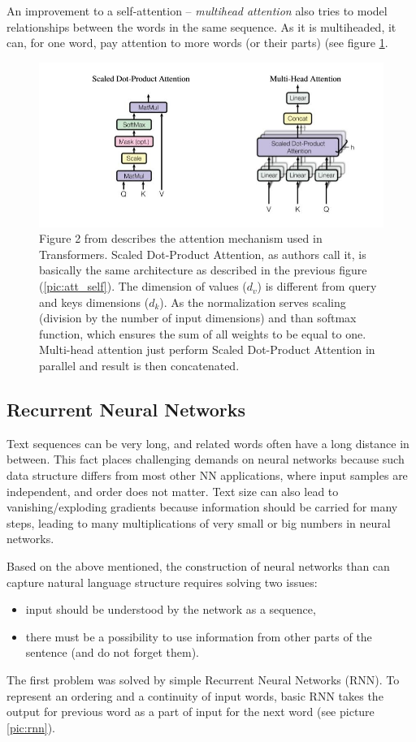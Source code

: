 An improvement to a self-attention -- \textit{multihead attention} \citep{Vaswani2017} also tries to model relationships between the words in the same sequence. As it is multiheaded, it can, for one word, pay attention to more words (or their parts) (see figure \ref{pic:att_multi}.
\begin{figure}[ht]
\centering
\includegraphics[width=1\columnwidth]{../img/attention_multi}
\caption{Figure 2 from \citep{Vaswani2017} describes the attention mechanism used in Transformers. Scaled Dot-Product Attention, as authors call it, is basically the same architecture as described in the previous figure (\ref{pic:att_self}). The dimension of values ($d_v$) is different from query and keys dimensions ($d_k$). As the normalization serves scaling (division by the number of input dimensions) and than softmax function, which ensures the sum of all weights to be equal to one. Multi-head attention just perform Scaled Dot-Product Attention in parallel and result is then concatenated.
}
\label{pic:att_multi}
\end{figure}
\subsection{Recurrent Neural Networks}
\label{sub:RNN}
Text sequences can be very long, and related words often have a long distance in between. This fact places challenging demands on neural networks because such data structure differs from most other NN applications, where input samples are independent, and order does not matter. Text size can also lead to vanishing/exploding gradients because information should be carried for many steps, leading to many multiplications of very small or big numbers in neural networks. %
\par
Based on the above mentioned, the construction of neural networks than can capture natural language structure requires solving two issues:
\begin{itemize}
\item input should be understood by the network as a sequence,
\item there must be a possibility to use information from other parts of the sentence (and do not forget them).
\end{itemize}
The first problem was solved by simple Recurrent Neural Networks (RNN). To represent an ordering and a continuity of input words, basic RNN takes the output for previous word as a part of input for the next word (see picture \ref{pic:rnn}). 
 
